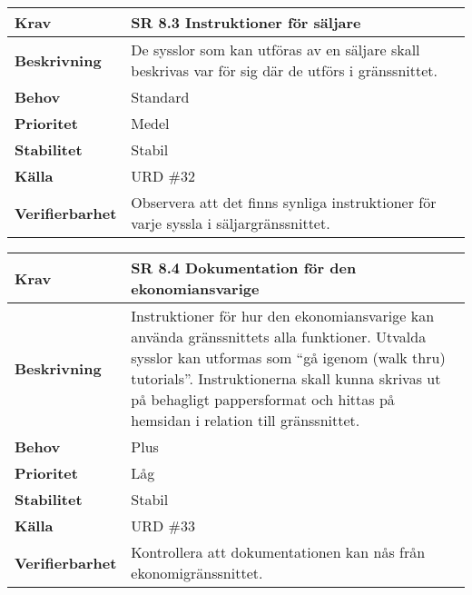 \documentclass[a4paper, twoside, 11pt, titlepage]{article}
\begin{document}
	\begin{tabular} { p{2.6cm} p{12.5cm} }
		\hline
		\sffamily\textbf{Krav} & \sffamily\textbf{SR 8.3 Instruktioner för säljare } \\
		\hline
		\sffamily\textbf{Beskrivning} & De sysslor som kan utföras av en säljare skall beskrivas var för sig där de utförs i gränssnittet.  \\
		\hline
		\sffamily\textbf{Behov} & Standard  \\
		\hline
		\sffamily\textbf{Prioritet} & Medel  \\
		\hline
		\sffamily\textbf{Stabilitet} & Stabil  \\
		\hline
		\sffamily\textbf{Källa} & URD \#32  \\
		\hline
		\sffamily\textbf{Verifierbarhet} & Observera att det finns synliga instruktioner för varje syssla i säljargränssnittet.  \\
		\hline
	\end{tabular}
	\vspace{6mm}

	\begin{tabular} { p{2.6cm} p{12.5cm} }
		\hline
		\sffamily\textbf{Krav} & \sffamily\textbf{SR 8.4 Dokumentation för den ekonomiansvarige } \\
		\hline
		\sffamily\textbf{Beskrivning} & Instruktioner för hur den ekonomiansvarige kan använda gränssnittets alla funktioner. Utvalda sysslor kan utformas som ``gå igenom (walk thru) tutorials''. Instruktionerna skall kunna skrivas ut på behagligt pappersformat och hittas på hemsidan i relation till gränssnittet.  \\
		\hline
		\sffamily\textbf{Behov} & Plus  \\
		\hline
		\sffamily\textbf{Prioritet} & Låg  \\
		\hline
		\sffamily\textbf{Stabilitet} & Stabil  \\
		\hline
		\sffamily\textbf{Källa} & URD \#33  \\
		\hline
		\sffamily\textbf{Verifierbarhet} & Kontrollera att dokumentationen kan nås från ekonomigränssnittet.  \\
		\hline
	\end{tabular}
	\vspace{6mm}
\end{document}
